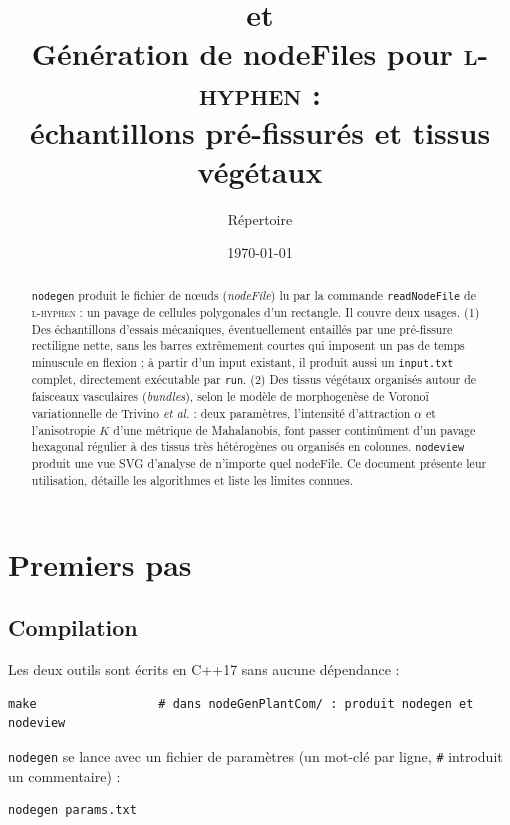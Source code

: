 \documentclass[11pt,a4paper]{article}
\title{\toolgen{} et \toolview{}\\[3pt]
  \large Génération de nodeFiles pour \textsc{l-hyphen} :\\
  échantillons pré-fissurés et tissus végétaux}
\author{Répertoire \code{nodeGenPlantCom/}}
\date{\today}
\newcommand{\code}[1]{\texttt{#1}}
\newcommand{\toolgen}{\code{nodegen}}
\newcommand{\toolview}{\code{nodeview}}
\begin{document}
\maketitle

\begin{abstract}
  \toolgen{} produit le fichier de nœuds (\emph{nodeFile}) lu par la commande \code{readNodeFile} de
  \textsc{l-hyphen} : un pavage de cellules polygonales d'un rectangle. Il couvre deux usages. (1) Des
  échantillons d'essais mécaniques, éventuellement entaillés par une pré-fissure rectiligne nette, sans les
  barres extrêmement courtes qui imposent un pas de temps minuscule en flexion ; à partir d'un input existant,
  il produit aussi un \code{input.txt} complet, directement exécutable par \code{run}. (2) Des tissus végétaux
  organisés autour de faisceaux vasculaires (\emph{bundles}), selon le modèle de morphogenèse de Voronoï
  variationnelle de Trivino \emph{et al.} : deux paramètres, l'intensité d'attraction $\alpha$ et l'anisotropie
  $K$ d'une métrique de Mahalanobis, font passer continûment d'un pavage hexagonal régulier à des tissus très
  hétérogènes ou organisés en colonnes. \toolview{} produit une vue SVG d'analyse de n'importe quel nodeFile. Ce
  document présente leur utilisation, détaille les algorithmes et liste les limites connues.
\end{abstract}

\tableofcontents

\section{Premiers pas}

\subsection{Compilation}

Les deux outils sont écrits en C++17 sans aucune dépendance :
\begin{lstlisting}
make                 # dans nodeGenPlantCom/ : produit nodegen et nodeview
\end{lstlisting}
\toolgen{} se lance avec un fichier de paramètres (un mot-clé par ligne, \code{\#} introduit un commentaire) :
\begin{lstlisting}
nodegen params.txt
\end{lstlisting}
\end{document}
